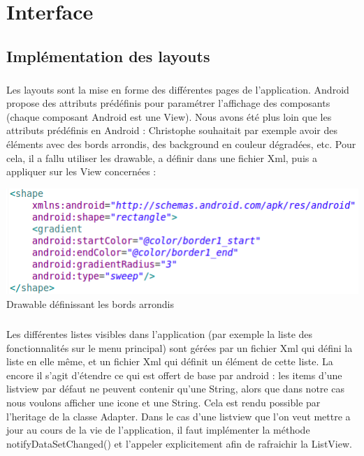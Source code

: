 \chapter{Interface}

\section*{Implémentation des layouts}
\paragraph{}
Les layouts sont la mise en forme des différentes pages de l'application. Android propose des attributs prédéfinis pour paramétrer l'affichage des composants (chaque composant Android est une View). Nous avons été plus loin que les attributs prédéfinis en Android : Christophe souhaitait par exemple avoir des éléments avec des bords arrondis, des background en couleur dégradées, etc.
Pour cela, il a fallu utiliser les drawable, a définir dans une fichier Xml, puis a appliquer sur les View concernées : 

\begin{center}
	\includegraphics[width=140mm]{images/drawable.png}
	Drawable définissant les bords arrondis
\end{center}

\paragraph{}
Les différentes listes visibles dans l'application (par exemple la liste des fonctionnalités sur le menu principal) sont gérées par un fichier Xml qui défini la liste en elle même, et un fichier Xml qui définit un élément de cette liste. La encore il s'agit d'étendre ce qui est offert de base par android : les items d'une listview par défaut ne peuvent contenir qu'une String, alors que dans notre cas nous voulons afficher une icone et une String. Cela est rendu possible par l'heritage de la classe Adapter. Dans le cas d'une listview que l'on veut mettre a jour au cours de la vie de l'application, il faut implémenter la méthode notifyDataSetChanged() et l'appeler explicitement afin de rafraichir la ListView.

